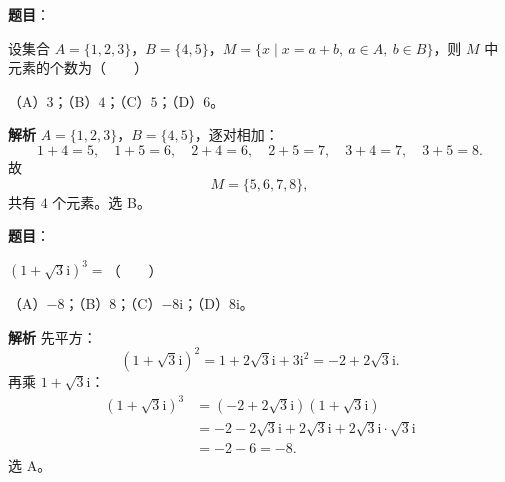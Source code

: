 

\begin{answer}

\textbf{题目}：

设集合 $A=\{1,2,3\}$，$B=\{4,5\}$，$M=\{x\mid x=a+b,\ a\in A,\ b\in B\}$，则 $M$ 中元素的个数为\mbox{（　　）}

（A）$3$；（B）$4$；（C）$5$；（D）$6$。

\textbf{解析}
$A=\{1,2,3\}$，$B=\{4,5\}$，逐对相加：
\nopagebreak[4]
\[1+4=5,\quad 1+5=6,\quad 2+4=6,\quad 2+5=7,\quad 3+4=7,\quad 3+5=8.\]
故
\nopagebreak[4]
\[M=\{5,6,7,8\},\]
共有 $4$ 个元素。选 B。


\end{answer}
\begin{answer}

\textbf{题目}：

$(1+\sqrt3\mathrm i)^3=$\mbox{（　　）}

（A）$-8$；（B）$8$；（C）$-8\mathrm i$；（D）$8\mathrm i$。

\textbf{解析}
先平方：
\nopagebreak[4]
\[(1+\sqrt3\mathrm i)^2=1+2\sqrt3\mathrm i+3\mathrm i^2
=-2+2\sqrt3\mathrm i.\]
再乘 $1+\sqrt3\mathrm i$：
\nopagebreak[4]
\[\begin{aligned}
(1+\sqrt3\mathrm i)^3
&=(-2+2\sqrt3\mathrm i)(1+\sqrt3\mathrm i)\\
&=-2-2\sqrt3\mathrm i+2\sqrt3\mathrm i+2\sqrt3\mathrm i\cdot\sqrt3\mathrm i\\
&=-2-6=-8.
\end{aligned}\]
选 A。


\end{answer}
